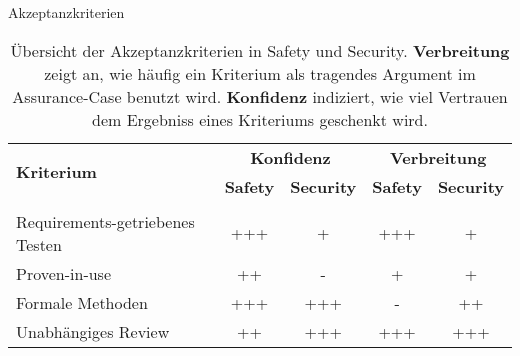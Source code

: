 %
\begin{frame}[T]{Akzeptanzkriterien}


  \begin{table}[]
    \begin{tabular}{lcccc}
      \multirow{2}{*}{\bfseries Kriterium}
        & \multicolumn{2}{c}{\bfseries Konfidenz}
        & \multicolumn{2}{c}{\bfseries Verbreitung} \\
                           & \bfseries Safety & \bfseries Security & \bfseries Safety & \bfseries Security \\
    \hline \\
    Requirements-getriebenes Testen & +++    & +        & +++        & +        \\
    Proven-in-use                   & ++     & -        & +          & +        \\
    Formale Methoden                & +++    & +++      & -          & ++       \\
    Unabhängiges Review             & ++     & +++      & +++        & +++      \\
    \end{tabular}
    \caption{
  Übersicht der Akzeptanzkriterien in Safety und Security. \textbf{Verbreitung} zeigt an, wie häufig ein Kriterium als tragendes Argument im Assurance-Case benutzt wird. \textbf{Konfidenz} indiziert, wie viel Vertrauen dem Ergebniss eines Kriteriums geschenkt wird. 
    }
  \end{table}



\end{frame}

